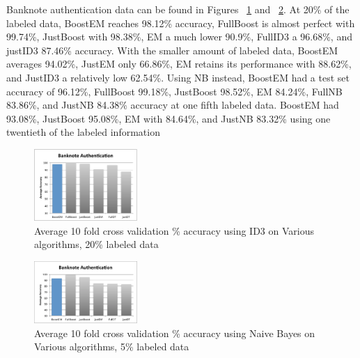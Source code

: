 \documentclass{sig-alternate}
\begin{document}
Banknote authentication data can be found in Figures ~\ref{bankAcc} and ~\ref{bankAcc5}. At 20\% of the labeled data, BoostEM reaches 98.12\% accuracy, FullBoost is almost perfect with 99.74\%, JustBoost with 98.38\%, EM a much lower 90.9\%, FullID3 a 96.68\%, and justID3 87.46\% accuracy.  With the smaller amount of labeled data, BoostEM averages 94.02\%, JustEM only 66.86\%, EM retains its performance with 88.62\%, and JustID3 a relatively low 62.54\%.
Using NB instead, BoostEM had a test set accuracy of 96.12\%, FullBoost 99.18\%, JustBoost 98.52\%, EM 84.24\%, FullNB 83.86\%, and JustNB 84.38\% accuracy at one fifth labeled data. BoostEM had 93.08\%, JustBoost 95.08\%, EM with 84.64\%, and JustNB 83.32\% using one twentieth of the labeled information
\begin{figure}[ht!]
\centering
\includegraphics[width=0.35\textwidth]{figures/bankAcc.pdf}
\caption{Average 10 fold cross validation \% accuracy using ID3 on Various algorithms, 20\% labeled data}
\label{bankAcc}
\end{figure}
\begin{figure}
\centering
\includegraphics[width=0.35\textwidth]{figures/bankAcc5.pdf}
\caption{Average 10 fold cross validation \% accuracy using Naive Bayes on Various algorithms, 5\% labeled data}
\label{bankAcc5}
\end{figure}
\end{document}
